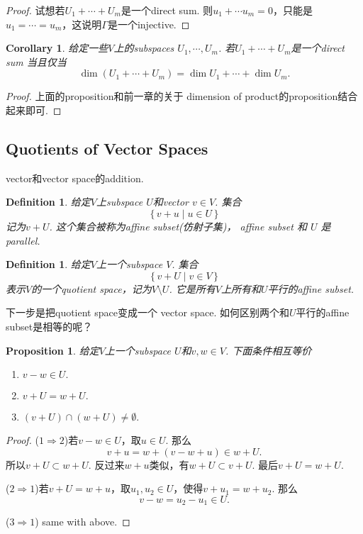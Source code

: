 \documentclass{article}
\newtheorem{corollary}[theorem]{Corollary}
\newtheorem{proposition}[theorem]{Proposition}
\newtheorem{definition}[theorem]{Definition}
\newcommand\Set[2]{\{\,#1\mid#2\,\}} %
\begin{document}
\begin{proof}
试想若$U_1 + \cdots + U_m$是一个direct sum. 则$u_1 + \cdots u_m = 0$，只能是$u_1 = \cdots = u_m$，这说明$\Gamma$是一个injective.
\end{proof}

\begin{corollary}
\rm 给定一些$V$上的subspaces $U_1,\cdots,U_m$. 若$U_1 + \cdots + U_m$是一个direct sum 当且仅当
$$
	\dim(U_1 + \cdots + U_m) = \dim U_1 + \cdots + \dim U_m.
$$
\end{corollary}

\begin{proof}
上面的proposition和前一章的关于 dimension of product的proposition结合起来即可.
\end{proof}

\newpage
\subsection{Quotients of Vector Spaces}


vector和vector space的addition.

\begin{definition}
\rm 给定$V$上subspace $U$和vector $v \in V$. 集合
$$
\Set{v+u}{u \in U}
$$
记为$v+U$. 这个集合被称为affine subset(仿射子集)， affine subset 和 $U$ 是parallel.
\end{definition}


\begin{definition}
\rm 给定$V$上一个subspace $V$. 集合
$$
\Set{v+U}{v \in V}
$$
表示$V$的一个quotient space，记为$V \setminus U$. 它是所有$V$上所有和$U$平行的affine subset.
\end{definition}

{\color{red} 下一步是把quotient space变成一个 vector space}. 如何区别两个和$U$平行的affine subset是相等的呢？

\begin{proposition}
\rm 给定$V$上一个subspace $U$和$v,w \in V$. 下面条件相互等价
\begin{enumerate}
	\item $v-w \in U.$
	\item $v+U = w+U.$
	\item $(v+U) \cap (w+U) \neq \emptyset.$
\end{enumerate}
\end{proposition}

\begin{proof}
($1 \Rightarrow 2$)若$v-w \in U$，取$u \in U$. 那么
$$
v + u  = w+(v-w+u) \in w+U.
$$
所以$v+U \subset w+U$. 反过来$w+u$类似，有$w+U \subset v+U$. 最后$v+U = w+U.$

($2 \Rightarrow 1$)若$v+U = w+u$，取$u_1,u_2 \in U$，使得$v+u_1 = w + u_2$. 那么
$$
v-w =u_2-u_1 \in U.
$$

($3 \Rightarrow 1$) same with above.
\end{proof}
\end{document}
